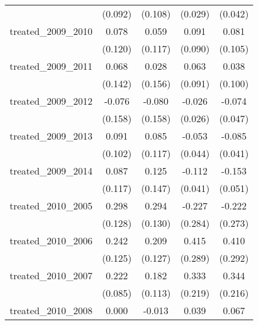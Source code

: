 {\begin{tabular}{l*{4}{c}}
            &     (0.092)         &     (0.108)         &     (0.029)         &     (0.042)         \\
[1em]
treated\_2009\_2010&       0.078         &       0.059         &       0.091         &       0.081         \\
            &     (0.120)         &     (0.117)         &     (0.090)         &     (0.105)         \\
[1em]
treated\_2009\_2011&       0.068         &       0.028         &       0.063         &       0.038         \\
            &     (0.142)         &     (0.156)         &     (0.091)         &     (0.100)         \\
[1em]
treated\_2009\_2012&      -0.076         &      -0.080         &      -0.026         &      -0.074         \\
            &     (0.158)         &     (0.158)         &     (0.026)         &     (0.047)         \\
[1em]
treated\_2009\_2013&       0.091         &       0.085         &      -0.053         &      -0.085\sym{*}  \\
            &     (0.102)         &     (0.117)         &     (0.044)         &     (0.041)         \\
[1em]
treated\_2009\_2014&       0.087         &       0.125         &      -0.112\sym{**} &      -0.153\sym{**} \\
            &     (0.117)         &     (0.147)         &     (0.041)         &     (0.051)         \\
[1em]
treated\_2010\_2005&       0.298\sym{*}  &       0.294\sym{*}  &      -0.227         &      -0.222         \\
            &     (0.128)         &     (0.130)         &     (0.284)         &     (0.273)         \\
[1em]
treated\_2010\_2006&       0.242         &       0.209         &       0.415         &       0.410         \\
            &     (0.125)         &     (0.127)         &     (0.289)         &     (0.292)         \\
[1em]
treated\_2010\_2007&       0.222\sym{**} &       0.182         &       0.333         &       0.344         \\
            &     (0.085)         &     (0.113)         &     (0.219)         &     (0.216)         \\
[1em]
treated\_2010\_2008&       0.000         &      -0.013         &       0.039         &       0.067         \\

\end{tabular}}
